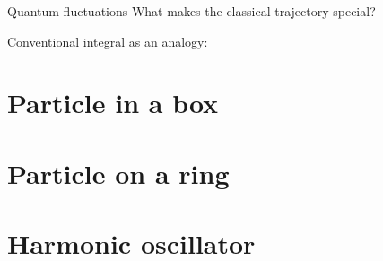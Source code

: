 \documentclass[t,dvipsnames]{beamer}
\begin{document}
\begin{frame}[c]{Quantum fluctuations}
 What makes the classical trajectory special?

 Conventional integral as an analogy:
\end{frame}

\section{Particle in a box}

\begin{frame}[c]{}
 \begin{center}
  \begin{minipage}{0.8\textwidth}
   \tableofcontents[currentsection]
  \end{minipage}
 \end{center}
\end{frame}

\begin{frame}[t]{}
\end{frame}

\section{Particle on a ring}

\begin{frame}[c]{}
 \begin{center}
  \begin{minipage}{0.8\textwidth}
   \tableofcontents[currentsection]
  \end{minipage}
 \end{center}
\end{frame}

\begin{frame}[t]{}
\end{frame}

\section{Harmonic oscillator}

\begin{frame}[c]{}
 \begin{center}
  \begin{minipage}{0.8\textwidth}
   \tableofcontents[currentsection]
  \end{minipage}
 \end{center}
\end{frame}

\begin{frame}[t]{}
\end{frame}
\end{document}
